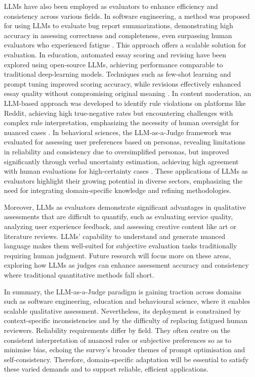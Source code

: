 \documentclass[acmsmall,screen]{acmart}
\begin{document}
LLMs have also been employed as evaluators to enhance efficiency and consistency across various fields. In software engineering, a method was proposed for using LLMs to evaluate bug report summarizations, demonstrating high accuracy in assessing correctness and completeness, even surpassing human evaluators who experienced fatigue \cite{kumar2024llms}. This approach offers a scalable solution for evaluation. In education, automated essay scoring and revising have been explored using open-source LLMs, achieving performance comparable to traditional deep-learning models. Techniques such as few-shot learning and prompt tuning improved scoring accuracy, while revisions effectively enhanced essay quality without compromising original meaning \cite{song2024automated}. In content moderation, an LLM-based approach was developed to identify rule violations on platforms like Reddit, achieving high true-negative rates but encountering challenges with complex rule interpretation, emphasizing the necessity of human oversight for nuanced cases \cite{kolla2024llm}. In behavioral sciences, the LLM-as-a-Judge framework was evaluated for assessing user preferences based on personas, revealing limitations in reliability and consistency due to oversimplified personas, but improved significantly through verbal uncertainty estimation, achieving high agreement with human evaluations for high-certainty cases \cite{dong2024can}. These applications of LLMs as evaluators highlight their growing potential in diverse sectors, emphasizing the need for integrating domain-specific knowledge and refining methodologies.

Moreover, LLMs as evaluators demonstrate significant advantages in qualitative assessments that are difficult to quantify, such as evaluating service quality, analyzing user experience feedback, and assessing creative content like art or literature reviews. LLMs' capability to understand and generate nuanced language makes them well-suited for subjective evaluation tasks traditionally requiring human judgment. Future research will focus more on these areas, exploring how LLMs as judges can enhance assessment accuracy and consistency where traditional quantitative methods fall short.

In summary, the LLM-as-a-Judge paradigm is gaining traction across domains such as software engineering, education and behavioural science, where it enables scalable qualitative assessment. Nevertheless, its deployment is constrained by context-specific inconsistencies and by the difficulty of replacing fatigued human reviewers. Reliability requirements differ by field. They often centre on the consistent interpretation of nuanced rules or subjective preferences so as to minimise bias, echoing the survey’s broader themes of prompt optimisation and self-consistency. Therefore, domain-specific adaptation will be essential to satisfy these varied demands and to support reliable, efficient applications.
\end{document}
